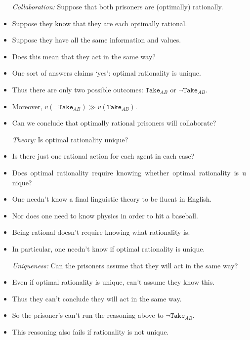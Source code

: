 \documentclass[a4paper, 11pt]{article} %
\begin{document}
\begin{itemize}
  \item[\it Collaboration:] Suppose that both prisoners are (optimally) rationally.
    \item Suppose they know that they are each optimally rational.
    \item Suppose they have all the same information and values.
    \item Does this mean that they act in the same way?
    \item One sort of answers claims `yes': optimal rationality is unique.
    \item Thus there are only two possible outcomes: $\texttt{Take}_{AB}$ or $\neg \texttt{Take}_{AB}$.
    \item Moreover, $v(\neg \texttt{Take}_{AB}) \gg v(\texttt{Take}_{AB})$.
    \item Can we conclude that optimally rational prisoners will collaborate?
  \item[\it Theory:] Is optimal rationality unique?
    \item Is there just one rational action for each agent in each case?
    \item \mbox{Does optimal rationality require knowing whether optimal rationality is unique?}
    \item One needn't know a final linguistic theory to be fluent in English.
    \item Nor does one need to know physics in order to hit a baseball.
    \item Being rational doesn't require knowing what rationality is.
    \item In particular, one needn't know if optimal rationality is unique.
  \item[\it Uniqueness:] Can the prisoners assume that they will act in the same way?
    \item Even if optimal rationality is unique, can't assume they know this.
    \item Thus they can't conclude they will act in the same way.
    \item So the prisoner's can't run the reasoning above to $\neg \texttt{Take}_{AB}$.
    \item This reasoning also fails if rationality is not unique.
\end{itemize}
\end{document}
